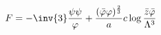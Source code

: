 \begin{equation}
  \label{eq:vyelimination}
  F = - \inv{3} \frac{\psi \psi}{\varphi} + \frac{(\bar{\varphi}
  \varphi)^{\frac{2}{3}}}{a} c \log \frac{\bar{z} \bar{\varphi}}{\Lambda^3}
\end{equation}

